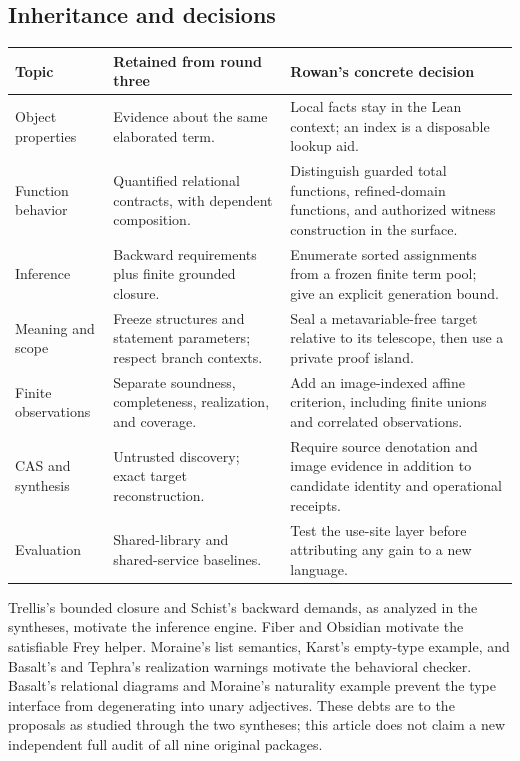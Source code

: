\documentclass[11pt,letterpaper]{article}
\theoremstyle{definition}\newtheorem{definition}[theorem]{Definition}
\theoremstyle{remark}\newtheorem{remark}[theorem]{Remark}
\begin{document}
\subsection{Inheritance and decisions}
\begin{center}\small
\begin{tabularx}{\textwidth}{@{}P{.22\textwidth}Y Y@{}}
\toprule Topic & Retained from round three & Rowan's concrete decision\\\midrule
Object properties & Evidence about the same elaborated term. & Local facts stay in the Lean context; an index is a disposable lookup aid.\\
Function behavior & Quantified relational contracts, with dependent composition. & Distinguish guarded total functions, refined-domain functions, and authorized witness construction in the surface.\\
Inference & Backward requirements plus finite grounded closure. & Enumerate sorted assignments from a frozen finite term pool; give an explicit generation bound.\\
Meaning and scope & Freeze structures and statement parameters; respect branch contexts. & Seal a metavariable-free target relative to its telescope, then use a private proof island.\\
Finite observations & Separate soundness, completeness, realization, and coverage. & Add an image-indexed affine criterion, including finite unions and correlated observations.\\
CAS and synthesis & Untrusted discovery; exact target reconstruction. & Require source denotation and image evidence in addition to candidate identity and operational receipts.\\
Evaluation & Shared-library and shared-service baselines. & Test the use-site layer before attributing any gain to a new language.\\
\bottomrule
\end{tabularx}
\end{center}

Trellis's bounded closure and Schist's backward demands, as analyzed in the
syntheses, motivate the inference engine. Fiber and Obsidian motivate the
satisfiable Frey helper. Moraine's list semantics, Karst's empty-type example,
and Basalt's and Tephra's realization warnings motivate the behavioral
checker. Basalt's relational diagrams and Moraine's naturality example prevent
the type interface from degenerating into unary adjectives. These debts are
to the proposals as studied through the two syntheses; this article does not
claim a new independent full audit of all nine original packages.
\end{document}
